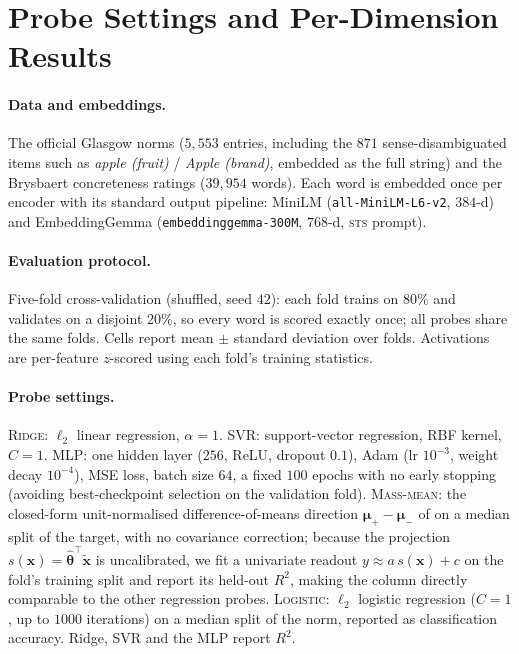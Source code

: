 
\section{Probe Settings and Per-Dimension Results}
\label{app:probes}

\paragraph{Data and embeddings.}
The official Glasgow norms ($5{,}553$ entries, including the $871$
sense-disambiguated items such as \emph{apple (fruit)} / \emph{Apple (brand)},
embedded as the full string) and the Brysbaert concreteness ratings
($39{,}954$ words). Each word is embedded once per encoder with its standard
output pipeline: MiniLM (\texttt{all-MiniLM-L6-v2}, $384$-d) and EmbeddingGemma
(\texttt{embeddinggemma-300M}, $768$-d, \textsc{sts} prompt).

\paragraph{Evaluation protocol.}
Five-fold cross-validation (shuffled, seed $42$): each fold trains on $80\%$ and
validates on a disjoint $20\%$, so every word is scored exactly once; all probes
share the same folds. Cells report mean $\pm$ standard deviation over folds.
Activations are per-feature $z$-scored using each fold's training statistics.

\paragraph{Probe settings.}
\textsc{Ridge}: $\ell_2$ linear regression, $\alpha=1$. \textsc{SVR}:
support-vector regression, RBF kernel, $C=1$. \textsc{MLP}: one hidden layer
($256$, ReLU, dropout $0.1$), Adam (lr $10^{-3}$, weight decay $10^{-4}$), MSE
loss, batch size $64$, a fixed $100$ epochs with no early stopping (avoiding
best-checkpoint selection on the validation fold). \textsc{Mass-mean}: the
closed-form unit-normalised difference-of-means direction
$\bm{\mu}_{+}-\bm{\mu}_{-}$ of \citet{marks2023geometry} on a median split of
the target, with no covariance correction; because the projection
$s(\bm{x})=\hat{\bm{\theta}}^{\top}\tilde{\bm{x}}$ is uncalibrated, we fit a
univariate readout $y \approx a\,s(\bm{x})+c$ on the fold's training split and
report its held-out $R^2$, making the column directly comparable to the other
regression probes. \textsc{Logistic}: $\ell_2$ logistic regression ($C=1$, up to
$1000$ iterations) on a median split of the norm, reported as classification
accuracy. Ridge, SVR and the MLP report $R^2$.

